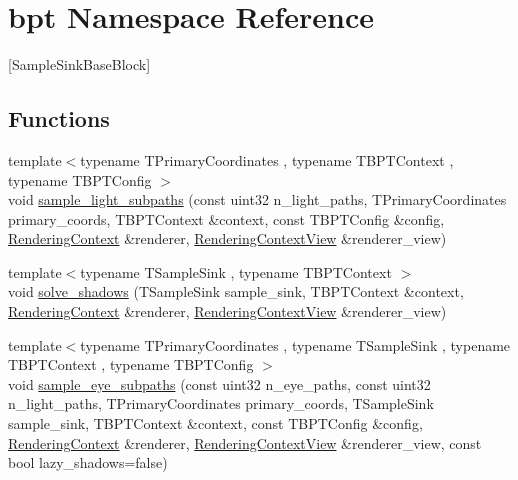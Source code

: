 \hypertarget{namespacebpt}{}\section{bpt Namespace Reference}
\label{namespacebpt}


\mbox{[}Sample\+Sink\+Base\+Block\mbox{]}  


\subsection*{Functions}
\begin{DoxyCompactItemize}
\item 
{\footnotesize template$<$typename T\+Primary\+Coordinates , typename T\+B\+P\+T\+Context , typename T\+B\+P\+T\+Config $>$ }\\void \hyperlink{group___b_p_t_lib_ga679afc8704a42ed1c8e6b57018cd676e}{sample\+\_\+light\+\_\+subpaths} (const uint32 n\+\_\+light\+\_\+paths, T\+Primary\+Coordinates primary\+\_\+coords, T\+B\+P\+T\+Context \&context, const T\+B\+P\+T\+Config \&config, \hyperlink{struct_rendering_context}{Rendering\+Context} \&renderer, \hyperlink{struct_rendering_context_view}{Rendering\+Context\+View} \&renderer\+\_\+view)
\item 
{\footnotesize template$<$typename T\+Sample\+Sink , typename T\+B\+P\+T\+Context $>$ }\\void \hyperlink{group___b_p_t_lib_ga67c2c1dbc4ee8212daf3728fafe55969}{solve\+\_\+shadows} (T\+Sample\+Sink sample\+\_\+sink, T\+B\+P\+T\+Context \&context, \hyperlink{struct_rendering_context}{Rendering\+Context} \&renderer, \hyperlink{struct_rendering_context_view}{Rendering\+Context\+View} \&renderer\+\_\+view)
\item 
{\footnotesize template$<$typename T\+Primary\+Coordinates , typename T\+Sample\+Sink , typename T\+B\+P\+T\+Context , typename T\+B\+P\+T\+Config $>$ }\\void \hyperlink{group___b_p_t_lib_ga5dcb245a5dfa3a0910069446d27aa8eb}{sample\+\_\+eye\+\_\+subpaths} (const uint32 n\+\_\+eye\+\_\+paths, const uint32 n\+\_\+light\+\_\+paths, T\+Primary\+Coordinates primary\+\_\+coords, T\+Sample\+Sink sample\+\_\+sink, T\+B\+P\+T\+Context \&context, const T\+B\+P\+T\+Config \&config, \hyperlink{struct_rendering_context}{Rendering\+Context} \&renderer, \hyperlink{struct_rendering_context_view}{Rendering\+Context\+View} \&renderer\+\_\+view, const bool lazy\+\_\+shadows=false)
\item 

\end{DoxyCompactItemize}

